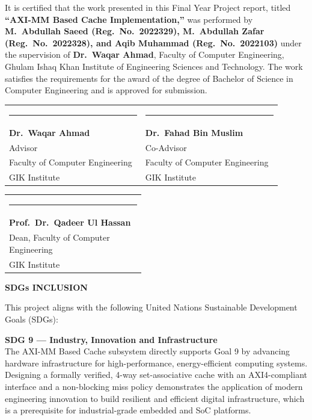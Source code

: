 \documentclass[12pt,letterpaper]{report}
\begin{document}
\noindent It is certified that the work presented in this Final Year Project
report, titled \textbf{``AXI-MM Based Cache Implementation,''} was
performed by \textbf{M.\ Abdullah Saeed (Reg.\ No.\ 2022329),
M.\ Abdullah Zafar (Reg.\ No.\ 2022328), and Aqib Muhammad
(Reg.\ No.\ 2022103)} under the supervision of
\textbf{Dr.\ Waqar Ahmad}, Faculty of Computer Engineering, Ghulam
Ishaq Khan Institute of Engineering Sciences and Technology.  The work
satisfies the requirements for the award of the degree of Bachelor of
Science in Computer Engineering and is approved for submission.

\vspace{2.5cm}

\noindent\begin{tabular}{@{}p{0.45\linewidth}p{0.45\linewidth}@{}}
\rule{0.40\linewidth}{0.4pt} & \rule{0.40\linewidth}{0.4pt} \\[2pt]
\textbf{Dr.\ Waqar Ahmad}   & \textbf{Dr.\ Fahad Bin Muslim} \\
Advisor                     & Co-Advisor \\
Faculty of Computer Engineering & Faculty of Computer Engineering \\
GIK Institute               & GIK Institute \\[2.5cm]
\end{tabular}

\noindent\begin{tabular}{@{}p{0.45\linewidth}@{}}
\rule{0.40\linewidth}{0.4pt} \\[2pt]
\textbf{Prof.\ Dr.\ Qadeer Ul Hassan} \\
Dean, Faculty of Computer Engineering \\
GIK Institute \\
\end{tabular}

\clearpage

\begin{center}
{\fontsize{14}{17}\selectfont\bfseries SDGs INCLUSION}
\end{center}
\vspace{18pt}

\noindent This project aligns with the following United Nations Sustainable
Development Goals (SDGs):

\vspace{12pt}

\noindent\textbf{SDG 9 — Industry, Innovation and Infrastructure}\\[4pt]
The AXI-MM Based Cache subsystem directly supports Goal 9 by advancing
hardware infrastructure for high-performance, energy-efficient computing
systems.  Designing a formally verified, 4-way set-associative cache
with an AXI4-compliant interface and a non-blocking miss policy
demonstrates the application of modern engineering innovation to build
resilient and efficient digital infrastructure, which is a prerequisite
for industrial-grade embedded and SoC platforms.
\end{document}

